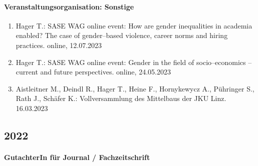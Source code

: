 \paragraph{Veranstaltungsorganisation: Sonstige}
\begin{enumerate}[leftmargin=*, labelsep=0.5cm]
\item Hager T.: SASE WAG online event: How are gender inequalities in academia enabled? The case of gender--based violence, career norms and hiring practices. online, 12.07.2023
\item Hager T.: SASE WAG online event: Gender in the field of socio--economics – current and future perspectives. online, 24.05.2023
\item Aistleitner M., Deindl R., Hager T., Heine F., Hornykewycz A., Pühringer S., Rath J., Schäfer K.: Vollversammlung des Mittelbaus der JKU Linz. 16.03.2023
\end{enumerate}\subsection*{2022}\paragraph{GutachterIn für Journal / Fachzeitschrift}
